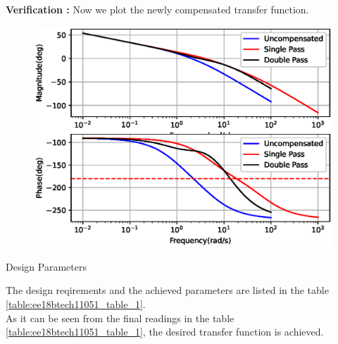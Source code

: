 \textbf{Verification : }
Now we plot the newly compensated transfer function.

\begin{figure}[!ht]
    \centering
    \includegraphics[width=\columnwidth]{./figs/ee18btech11051/ee18btech11051_fig3.eps}
    \label{fig:ee18btech11051_3}
\end{figure}

\begin{table}[!ht]
    \centering
    
    \caption{Design Parameters}
    \label{table:ee18btech11051_table_1}
\end{table}

The design reqirements and the achieved parameters are listed in the table \ref{table:ee18btech11051_table_1}.\\As it can be seen from the final readings in the table \ref{table:ee18btech11051_table_1}, the desired transfer function is achieved. 

